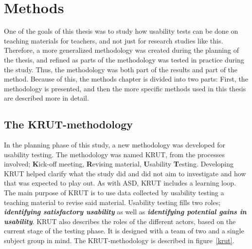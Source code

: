 \chapter{Methods}
One of the goals of this thesis was to study how usability tests can be done on teaching materials for teachers, and not just for research studies like this. Therefore, a more generalized methodology was created during the planning of the thesis, and refined as parts of the methodology was tested in practice during the study. Thus, the methodology was both part of the results and part of the method. Because of this, the methods chapter is divided into two parts: First, the methodology is presented, and then the more specific methods used in this thesis are described more in detail.

%
%

\section{The KRUT-methodology}
In the planning phase of this study, a new methodology was developed for usability testing. The methodology was named KRUT, from the processes involved; \textbf{K}ick-off meeting, \textbf{R}evising material, \textbf{U}sability \textbf{T}esting. Developing KRUT helped clarify what the study did and did not aim to investigate and how that was expected to play out. As with ASD, KRUT includes a learning loop. The main purpose of KRUT is to use data collected by usability testing a teaching material to revise said material. Usability testing fills two roles; \textbf{\textit{identifying satisfactory usability}} as well as \textbf{\textit{identifying potential gains in usability}}. KRUT also describes the roles of the different actors, based on the current stage of the testing phase. It is designed with a team of two and a single subject group in mind. The KRUT-methodology is described in figure~\ref{krut}.

